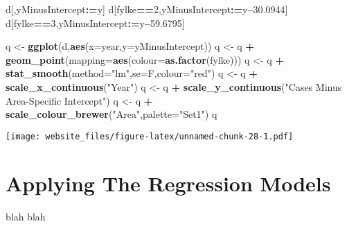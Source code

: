 \documentclass[]{book}
\newenvironment{Shaded}{\begin{snugshade}}{\end{snugshade}}
\newcommand{\KeywordTok}[1]{\textcolor[rgb]{0.13,0.29,0.53}{\textbf{#1}}}
\newcommand{\DataTypeTok}[1]{\textcolor[rgb]{0.13,0.29,0.53}{#1}}
\newcommand{\DecValTok}[1]{\textcolor[rgb]{0.00,0.00,0.81}{#1}}
\newcommand{\FloatTok}[1]{\textcolor[rgb]{0.00,0.00,0.81}{#1}}
\newcommand{\StringTok}[1]{\textcolor[rgb]{0.31,0.60,0.02}{#1}}
\newcommand{\OperatorTok}[1]{\textcolor[rgb]{0.81,0.36,0.00}{\textbf{#1}}}
\newcommand{\ErrorTok}[1]{\textcolor[rgb]{0.64,0.00,0.00}{\textbf{#1}}}
\newcommand{\NormalTok}[1]{#1}
\begin{document}
\begin{Shaded}
\begin{Highlighting}[]
\NormalTok{d[,yMinusIntercept}\OperatorTok{:}\ErrorTok{=}\NormalTok{y]}
\NormalTok{d[fylke}\OperatorTok{==}\DecValTok{2}\NormalTok{,yMinusIntercept}\OperatorTok{:}\ErrorTok{=}\NormalTok{y}\OperatorTok{--}\FloatTok{30.0944}\NormalTok{]}
\NormalTok{d[fylke}\OperatorTok{==}\DecValTok{3}\NormalTok{,yMinusIntercept}\OperatorTok{:}\ErrorTok{=}\NormalTok{y}\OperatorTok{--}\FloatTok{59.6795}\NormalTok{]}

\NormalTok{q <-}\StringTok{ }\KeywordTok{ggplot}\NormalTok{(d,}\KeywordTok{aes}\NormalTok{(}\DataTypeTok{x=}\NormalTok{year,}\DataTypeTok{y=}\NormalTok{yMinusIntercept))}
\NormalTok{q <-}\StringTok{ }\NormalTok{q }\OperatorTok{+}\StringTok{ }\KeywordTok{geom_point}\NormalTok{(}\DataTypeTok{mapping=}\KeywordTok{aes}\NormalTok{(}\DataTypeTok{colour=}\KeywordTok{as.factor}\NormalTok{(fylke)))}
\NormalTok{q <-}\StringTok{ }\NormalTok{q }\OperatorTok{+}\StringTok{ }\KeywordTok{stat_smooth}\NormalTok{(}\DataTypeTok{method=}\StringTok{"lm"}\NormalTok{,}\DataTypeTok{se=}\NormalTok{F,}\DataTypeTok{colour=}\StringTok{"red"}\NormalTok{)}
\NormalTok{q <-}\StringTok{ }\NormalTok{q }\OperatorTok{+}\StringTok{ }\KeywordTok{scale_x_continuous}\NormalTok{(}\StringTok{"Year"}\NormalTok{)}
\NormalTok{q <-}\StringTok{ }\NormalTok{q }\OperatorTok{+}\StringTok{ }\KeywordTok{scale_y_continuous}\NormalTok{(}\StringTok{"Cases Minus Area-Specific Intercept"}\NormalTok{)}
\NormalTok{q <-}\StringTok{ }\NormalTok{q }\OperatorTok{+}\StringTok{ }\KeywordTok{scale_colour_brewer}\NormalTok{(}\StringTok{"Area"}\NormalTok{,}\DataTypeTok{palette=}\StringTok{"Set1"}\NormalTok{)}
\NormalTok{q}
\end{Highlighting}
\end{Shaded}

\texttt{[image: website\_files/figure-latex/unnamed-chunk-28-1.pdf]}

\section{Applying The Regression
Models}\label{applying-the-regression-models}

blah blah


\end{document}

